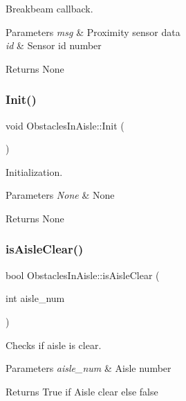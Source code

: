 Breakbeam callback. 


\begin{DoxyParams}{Parameters}
{\em msg} & Proximity sensor data \\
\hline
{\em id} & Sensor id number \\
\hline
\end{DoxyParams}
\begin{DoxyReturn}{Returns}
None 
\end{DoxyReturn}
\mbox{\label{classObstaclesInAisle_a44704e14f7829f5e3a81e0f6595bab63}} 
\subsubsection{\texorpdfstring{Init()}{Init()}}
{\footnotesize\ttfamily void Obstacles\+In\+Aisle\+::\+Init (\begin{DoxyParamCaption}{ }\end{DoxyParamCaption})}



Initialization. 


\begin{DoxyParams}{Parameters}
{\em None} & None \\
\hline
\end{DoxyParams}
\begin{DoxyReturn}{Returns}
None 
\end{DoxyReturn}
\mbox{\label{classObstaclesInAisle_a30674dc5290f284f32ad2730dc0fb8a5}} 
\subsubsection{\texorpdfstring{is\+Aisle\+Clear()}{isAisleClear()}}
{\footnotesize\ttfamily bool Obstacles\+In\+Aisle\+::is\+Aisle\+Clear (\begin{DoxyParamCaption}\item[{int}]{aisle\+\_\+num }\end{DoxyParamCaption})}



Checks if aisle is clear. 


\begin{DoxyParams}{Parameters}
{\em aisle\+\_\+num} & Aisle number \\
\hline
\end{DoxyParams}
\begin{DoxyReturn}{Returns}
True if Aisle clear else false 
\end{DoxyReturn}
\mbox{\label{classObstaclesInAisle_afeb7df3fceeec86c72b67e43c55bae84}} 
